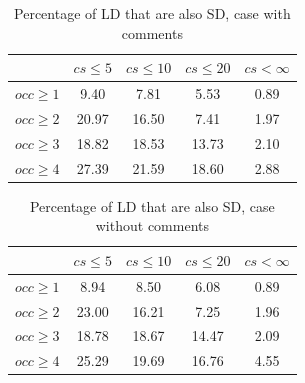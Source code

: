 \documentclass[a4paper,twoside]{article}
\begin{document}
\begin{table}[!h]
\renewcommand{\arraystretch}{1.25}
\caption{Percentage of LD that are also SD, case with comments}
\label{tab:percLD:comm}
\centering

\begin{tabular}{|c|c|c|c|c|}
\hline
	      &	$cs\leq 5$	&	$cs\leq 10$	&	$cs\leq 20$	&	$cs< \infty$	\\
\hline
$occ\geq 1$	&	9.40	&	7.81	&	5.53	&	0.89	\\
$occ\geq 2$	&	20.97	&	16.50	&	7.41	&	1.97	\\
$occ\geq 3$&	18.82	&	18.53	&	13.73	&	2.10	\\
$occ\geq 4$&	27.39	&	21.59	&	18.60	&	2.88	\\

\hline
\end{tabular}
\end{table}


\begin{table}[!h]
\renewcommand{\arraystretch}{1.25}
\caption{Percentage of LD that are also SD, case without comments}
\label{tab:percLD:nocomm}
\centering
\begin{tabular}{|c|c|c|c|c|}
\hline
	      &	$cs\leq 5$	&	$cs\leq 10$	&	$cs\leq 20$	&	$cs< \infty$	\\
\hline
$occ\geq 1$	&	8.94	&	8.50	&	6.08	&	0.89	\\
$occ\geq 2$	&	23.00	&	16.21	&	7.25	&	1.96	\\
$occ\geq 3$	&	18.78	&	18.67	&	14.47	&	2.09	\\
$occ\geq 4$	&	25.29	&	19.69	&	16.76	&	4.55	\\

\hline
\end{tabular}
\end{table}
\end{document}
